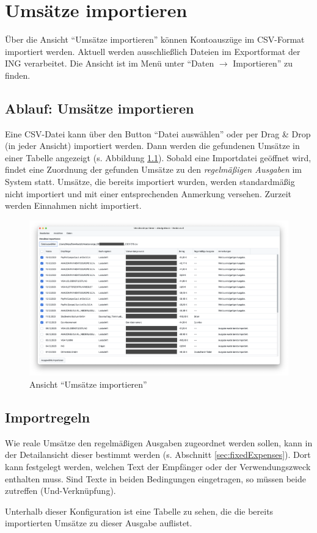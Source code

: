 \chapter{Umsätze importieren}

Über die Ansicht "`Umsätze importieren"' können Kontoauszüge im CSV-Format importiert werden. Aktuell werden ausschließlich Dateien im Exportformat der ING verarbeitet. Die Ansicht ist im Menü unter "`Daten $\rightarrow$ Importieren"' zu finden.

\section{Ablauf: Umsätze importieren}

Eine CSV-Datei kann über den Button "`Datei auswählen"' oder per Drag \& Drop (in jeder Ansicht) importiert werden. Dann werden die gefundenen Umsätze in einer Tabelle angezeigt (s. Abbildung \ref{fig:ImportView}). Sobald eine Importdatei geöffnet wird, findet eine Zuordnung der gefunden Umsätze zu den \textit{regelmäßigen Ausgaben} im System statt. Umsätze, die bereits importiert wurden, werden standardmäßig nicht importiert und mit einer entsprechenden Anmerkung versehen. Zurzeit werden Einnahmen nicht importiert.

\begin{figure}[h!]
	\centering
	\includegraphics[width=\textwidth]{img/Screenshot-ImportView}
	\vspace{-2em}
	\caption{Ansicht "`Umsätze importieren"'}
	\label{fig:ImportView}
\end{figure}

\section{Importregeln}

Wie reale Umsätze den regelmäßigen Ausgaben zugeordnet werden sollen, kann in der Detailansicht dieser bestimmt werden (s. Abschnitt \ref{sec:fixedExpenses}). Dort kann festgelegt werden, welchen Text der Empfänger oder der Verwendungszweck enthalten muss. Sind Texte in beiden Bedingungen eingetragen, so müssen beide zutreffen (Und-Verknüpfung). 

Unterhalb dieser Konfiguration ist eine Tabelle zu sehen, die die bereits importierten Umsätze zu dieser Ausgabe auflistet. 